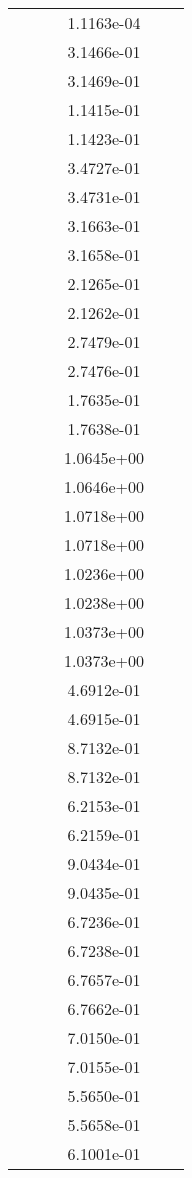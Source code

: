\begin{xltabular}{\textwidth}{r|rS[table-format=1.3e+2]S[table-format=1.4e+2]S[table-format=1.4e+2]S[table-format=-1.5]}
&  &  & 1.1163e-04 & & \\
&  &  & 3.1466e-01 & & \\
&  &  & 3.1469e-01 & & \\
&  &  & 1.1415e-01 & & \\
&  &  & 1.1423e-01 & & \\
&  &  & 3.4727e-01 & & \\
&  &  & 3.4731e-01 & & \\
&  &  & 3.1663e-01 & & \\
&  &  & 3.1658e-01 & & \\
&  &  & 2.1265e-01 & & \\
&  &  & 2.1262e-01 & & \\
&  &  & 2.7479e-01 & & \\
&  &  & 2.7476e-01 & & \\
&  &  & 1.7635e-01 & & \\
&  &  & 1.7638e-01 & & \\
&  &  & 1.0645e+00 & & \\
&  &  & 1.0646e+00 & & \\
&  &  & 1.0718e+00 & & \\
&  &  & 1.0718e+00 & & \\
&  &  & 1.0236e+00 & & \\
&  &  & 1.0238e+00 & & \\
&  &  & 1.0373e+00 & & \\
&  &  & 1.0373e+00 & & \\
&  &  & 4.6912e-01 & & \\
&  &  & 4.6915e-01 & & \\
&  &  & 8.7132e-01 & & \\
&  &  & 8.7132e-01 & & \\
&  &  & 6.2153e-01 & & \\
&  &  & 6.2159e-01 & & \\
&  &  & 9.0434e-01 & & \\
&  &  & 9.0435e-01 & & \\
&  &  & 6.7236e-01 & & \\
&  &  & 6.7238e-01 & & \\
&  &  & 6.7657e-01 & & \\
&  &  & 6.7662e-01 & & \\
&  &  & 7.0150e-01 & & \\
&  &  & 7.0155e-01 & & \\
&  &  & 5.5650e-01 & & \\
&  &  & 5.5658e-01 & & \\
&  &  & 6.1001e-01 & & \\

\end{xltabular}

